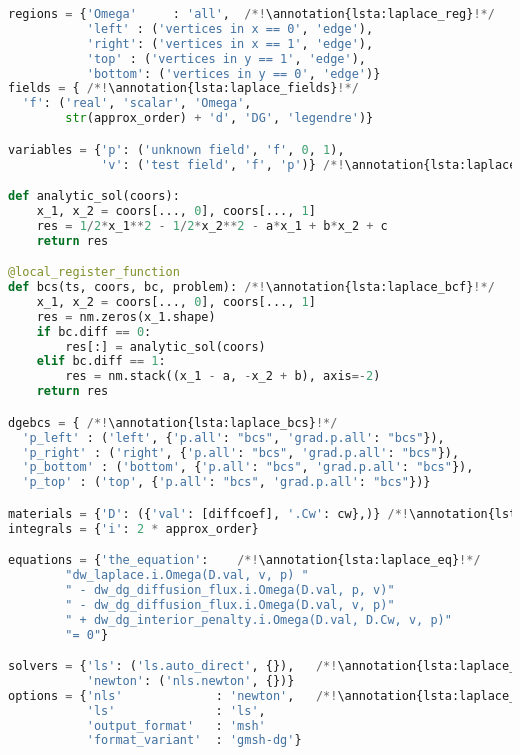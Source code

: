 \setcounter{lstannotation}{0}
\begin{lstlisting}[language=Python, caption=\pysauce{example\_dg\_laplace.py}, 
label={lst:laplace}]
regions = {'Omega'     : 'all',  /*!\annotation{lsta:laplace_reg}!*/
           'left' : ('vertices in x == 0', 'edge'),
           'right': ('vertices in x == 1', 'edge'),
           'top' : ('vertices in y == 1', 'edge'),
           'bottom': ('vertices in y == 0', 'edge')}
fields = { /*!\annotation{lsta:laplace_fields}!*/
  'f': ('real', 'scalar', 'Omega', 
        str(approx_order) + 'd', 'DG', 'legendre')}

variables = {'p': ('unknown field', 'f', 0, 1),
             'v': ('test field', 'f', 'p')} /*!\annotation{lsta:laplace_vars}!*/

def analytic_sol(coors): 
    x_1, x_2 = coors[..., 0], coors[..., 1]
    res = 1/2*x_1**2 - 1/2*x_2**2 - a*x_1 + b*x_2 + c
    return res

@local_register_function
def bcs(ts, coors, bc, problem): /*!\annotation{lsta:laplace_bcf}!*/
    x_1, x_2 = coors[..., 0], coors[..., 1]
    res = nm.zeros(x_1.shape)
    if bc.diff == 0:
        res[:] = analytic_sol(coors)
    elif bc.diff == 1:
        res = nm.stack((x_1 - a, -x_2 + b), axis=-2)
    return res

dgebcs = { /*!\annotation{lsta:laplace_bcs}!*/
  'p_left' : ('left', {'p.all': "bcs", 'grad.p.all': "bcs"}),
  'p_right' : ('right', {'p.all': "bcs", 'grad.p.all': "bcs"}),
  'p_bottom' : ('bottom', {'p.all': "bcs", 'grad.p.all': "bcs"}),
  'p_top' : ('top', {'p.all': "bcs", 'grad.p.all': "bcs"})}

materials = {'D': ({'val': [diffcoef], '.Cw': cw},)} /*!\annotation{lsta:laplace_mat}!*/
integrals = {'i': 2 * approx_order}

equations = {'the_equation':    /*!\annotation{lsta:laplace_eq}!*/
        "dw_laplace.i.Omega(D.val, v, p) " 
        " - dw_dg_diffusion_flux.i.Omega(D.val, p, v)" 
        " - dw_dg_diffusion_flux.i.Omega(D.val, v, p)" 
        " + dw_dg_interior_penalty.i.Omega(D.val, D.Cw, v, p)"
        "= 0"}

solvers = {'ls': ('ls.auto_direct', {}),   /*!\annotation{lsta:laplace_solv}!*/
           'newton': ('nls.newton', {})}
options = {'nls'             : 'newton',   /*!\annotation{lsta:laplace_opts}!*/
           'ls'              : 'ls',
           'output_format'   : 'msh'
           'format_variant'  : 'gmsh-dg'}
\end{lstlisting}


